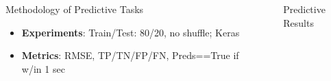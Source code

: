 \documentclass[final]{beamer}
\newlength{\sepwidth}
\newlength{\colwidth}
\newcommand{\separatorcolumn}{\begin{column}{\sepwidth}\end{column}}
\begin{document}
\begin{frame}[t]
\begin{columns}[t]
\begin{column}{\colwidth}
\begin{exampleblock}{\huge{Methodology of Predictive Tasks}}
{\begin{itemize}
                  1. Hourly split daily usage into 24 cols (labeled 0 - 23)\\
                  2. Lookback 3-5 time steps from the current timestamp\\
                  3. One-hot-encoding; Min-Max scaler
            \item \textbf{Experiments}: Train/Test: 80/20, no shuffle; Keras

            \item \textbf{Metrics}: RMSE, TP/TN/FP/FN, Preds==True if w/in 1 sec

          \end{itemize} }
      \end{exampleblock}

    \end{column}

    \separatorcolumn

    \begin{column}{\colwidth}

      \begin{block}
        {\huge{Predictive Results}}



\end{block}
\end{column}
\end{columns}
\end{frame}
\end{document}

